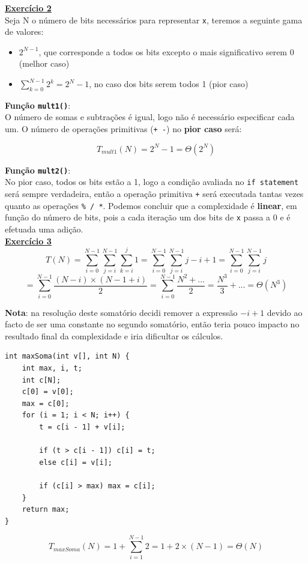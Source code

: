 \documentclass[a4paper,11pt]{article}
\begin{document}
	\newpage
	
	\noindent \underline{\textbf{Exercício 2}}\\
	
	\noindent Seja N o número de bits necessários para representar \texttt{x}, teremos a seguinte gama de valores:
	\begin{itemize}
		\item $ 2^{N-1} $, que corresponde a todos os bits excepto o mais significativo serem 0 (melhor caso)
		\item $ \sum_{k=0}^{N-1} 2^k = 2^N - 1 $, no caso dos bits serem todos 1 (pior caso)
	\end{itemize}
	
	\noindent \textbf{Função \texttt{mult1()}}:\\
	
	\noindent O número de somas e subtrações é igual, logo não é necessário especificar cada um. O número de operações primitivas (\texttt{+ -}) no \textbf{pior caso} será:
	
	\[ T_{mult1}(N) = 2^N - 1 = \Theta(2^N) \]
	
	\noindent \textbf{Função \texttt{mult2()}}:\\
	
	\noindent No pior caso, todos os bits estão a 1, logo a condição avaliada no \texttt{if statement} será sempre verdadeira, então a operação primitiva \texttt{+} será executada tantas vezes quanto as operações \texttt{\% / *}. Podemos concluir que a complexidade é \textbf{linear}, em função do número de bits, pois a cada iteração um dos bits de \texttt{x} passa a 0 e é efetuada uma adição.\\
	
	
	\noindent \underline{\textbf{Exercício 3}}\\
	
	\[
		T(N) = \sum_{i=0}^{N-1} \sum_{j=i}^{N-1} \sum_{k=i}^{j} 1 = \sum_{i=0}^{N-1} \sum_{j=i}^{N-1} j-i+1 = \sum_{i=0}^{N-1} \sum_{j=i}^{N-1} j	
	\]
	\[
		= \sum_{i=0}^{N-1} \frac{(N-i) \times (N-1+i)}{2} = \sum_{i=0}^{N-1} \frac{N^2 + ...}{2} = \frac{N^3}{3} + ... = \Theta(N^3)
	\]
	
	\noindent \textbf{Nota}: na resolução deste somatório decidi remover a expressão $ -i + 1 $ devido ao facto de ser uma constante no segundo somatório, então teria pouco impacto no resultado final da complexidade e iria dificultar os cálculos.
	
\begin{Verbatim}[tabsize=4]
int maxSoma(int v[], int N) {
	int max, i, t;
	int c[N];
	c[0] = v[0];
	max = c[0];
	for (i = 1; i < N; i++) {
		t = c[i - 1] + v[i];
				
		if (t > c[i - 1]) c[i] = t;
		else c[i] = v[i];
				
		if (c[i] > max) max = c[i];
	}
	return max;
}
	\end{Verbatim}
	\[
	T_{maxSoma}(N) = 1 + \sum_{i=1}^{N-1} 2 = 1 + 2 \times (N-1) = \Theta(N)
	\]
	
\end{document}
